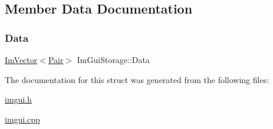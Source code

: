 \subsection{Member Data Documentation}
\mbox{\label{struct_im_gui_storage_aab0b9789fac598a34c500459259fde42}} 
\subsubsection{\texorpdfstring{Data}{Data}}
{\footnotesize\ttfamily \mbox{\hyperlink{class_im_vector}{Im\+Vector}}$<$\mbox{\hyperlink{struct_im_gui_storage_1_1_pair}{Pair}}$>$ Im\+Gui\+Storage\+::\+Data}



The documentation for this struct was generated from the following files\+:\begin{DoxyCompactItemize}
\item 
\mbox{\hyperlink{imgui_8h}{imgui.\+h}}\item 
\mbox{\hyperlink{imgui_8cpp}{imgui.\+cpp}}\end{DoxyCompactItemize}
